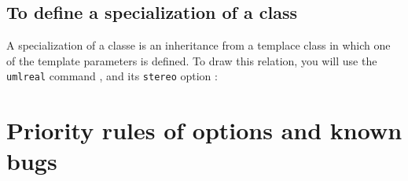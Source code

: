 \documentclass[a4paper,11pt]{report}
\newcommand{\inputTikZ}[1]{%
  }%
\newcommand{\inputTikZ}[1]{%
    \texttt{[image: fig/\#1.pdf]}%
  }%
\begin{document}
\begin{center}
\inputTikZ{tikzumlset}
\end{center}

\subsection{To define a specialization of a class}

A specialization of a classe is an inheritance from a templace class in which one of the template parameters is defined. To draw this relation,  you will use the {\tt umlreal} command , and its {\tt stereo} option :

\medskip

\begin{minipage}{0.5\textwidth}

\end{minipage}
\begin{minipage}{0.5\textwidth}
\begin{center}
\inputTikZ{specialisation}
\end{center}
\end{minipage}

\section{Priority rules of options and known bugs}\label{s.classbug}
\end{document}
